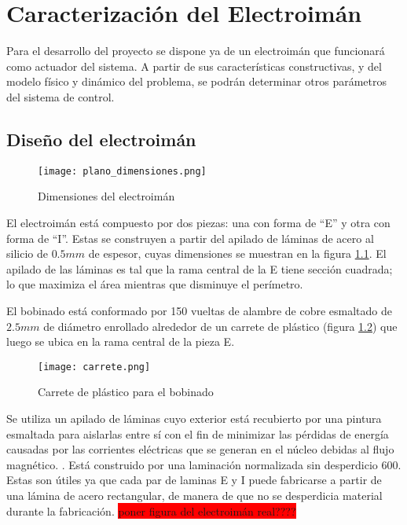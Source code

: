 \chapter{Caracterización del  Electroimán}  \label{cap:CaracterizacionElectroiman}

\noindent Para el desarrollo del proyecto se dispone ya de un electroimán que funcionará como actuador del sistema. A partir de sus características constructivas, y del modelo físico y dinámico del problema, se podrán determinar otros parámetros del sistema de control.

\section{Diseño del electroimán} \label{section_disenio_electroimán}

\begin{figure}[H]
	\centering
	\texttt{[image: plano\_dimensiones.png]}
	\caption{Dimensiones del electroimán}
	\label{fig:img_plano_dimensiones}
\end{figure}

\noindent El electroimán está compuesto por dos piezas: una con forma de “E” y otra con forma de “I”. Estas se construyen a partir del apilado de láminas de acero al silicio de $0.5mm$ de espesor, cuyas dimensiones se muestran en la figura \ref{fig:img_plano_dimensiones}. El apilado de las láminas es tal que la rama central de la E tiene sección cuadrada; lo que maximiza el área mientras que disminuye el perímetro.

\noindent El bobinado está conformado por 150 vueltas de alambre de cobre esmaltado de $2.5mm$ de diámetro enrollado alrededor de un carrete de plástico (figura \ref{fig:img_carrete}) que luego se ubica en la rama central de la pieza E.

\begin{figure}[H]
	\centering
	\texttt{[image: carrete.png]}
	\caption{Carrete de plástico para el bobinado}
	\label{fig:img_carrete}
\end{figure}


\noindent Se utiliza un apilado de láminas cuyo exterior está recubierto por una pintura esmaltada para aislarlas entre sí con el fin de minimizar las pérdidas de energía causadas por las corrientes eléctricas que se generan en el núcleo debidas al flujo magnético.
.
\noindent Está construido por una laminación normalizada sin desperdicio 600. Estas son útiles ya que cada par de laminas E y I puede fabricarse a partir de una lámina de acero rectangular, de manera de que no se desperdicia material durante la fabricación. 
\colorbox{red}{poner figura del electroimán real????}


